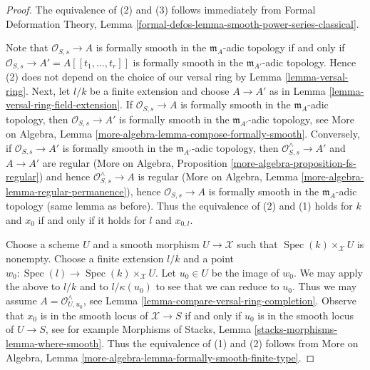 \documentclass[10pt,a4paper]{amsart}
\theoremstyle{plain}
\theoremstyle{definition}
\theoremstyle{remark}
\numberwithin{equation}{subsection}
\def\Spec{\mathop{\mathrm{Spec}}}
\begin{document}
\begin{proof}
The equivalence of (2) and (3) follows immediately from
Formal Deformation Theory, Lemma
\ref{formal-defos-lemma-smooth-power-series-classical}.

\medskip\noindent
Note that $\mathcal{O}_{S, s} \to A$ is formally smooth in the
$\mathfrak m_A$-adic topology if and only if
$\mathcal{O}_{S, s} \to A' = A[[t_1, \ldots, t_r]]$
is formally smooth in the $\mathfrak m_{A'}$-adic topology.
Hence (2) does not depend on the choice
of our versal ring by Lemma \ref{lemma-versal-ring}.
Next, let $l/k$ be a finite extension and choose
$A \to A'$ as in Lemma \ref{lemma-versal-ring-field-extension}.
If $\mathcal{O}_{S, s} \to A$ is formally smooth in the
$\mathfrak m_A$-adic topology, then $\mathcal{O}_{S, s} \to A'$
is formally smooth in the $\mathfrak m_{A'}$-adic topology, see
More on Algebra, Lemma \ref{more-algebra-lemma-compose-formally-smooth}.
Conversely, if $\mathcal{O}_{S, s} \to A'$
is formally smooth in the $\mathfrak m_{A'}$-adic topology,
then $\mathcal{O}_{S, s}^\wedge \to A'$ and $A \to A'$ are regular
(More on Algebra, Proposition \ref{more-algebra-proposition-fs-regular})
and hence $\mathcal{O}_{S, s}^\wedge \to A$ is regular
(More on Algebra, Lemma \ref{more-algebra-lemma-regular-permanence}),
hence $\mathcal{O}_{S, s} \to A$ is formally smooth in the
$\mathfrak m_A$-adic topology (same lemma as before).
Thus the equivalence of (2) and (1) holds for
$k$ and $x_0$ if and only if it holds for $l$ and $x_{0, l}$.

\medskip\noindent
Choose a scheme $U$ and a smooth morphism $U \to \mathcal{X}$ such
that $\Spec(k) \times_\mathcal{X} U$ is nonempty. Choose a finite
extension $l/k$ and a point $w_0 : \Spec(l) \to \Spec(k) \times_\mathcal{X} U$.
Let $u_0 \in U$ be the image of $w_0$.
We may apply the above to $l/k$ and to $l/\kappa(u_0)$
to see that we can reduce to $u_0$. Thus we may assume
$A = \mathcal{O}_{U, u_0}^\wedge$, see
Lemma \ref{lemma-compare-versal-ring-completion}.
Observe that $x_0$ is in the smooth locus of $\mathcal{X} \to S$
if and only if $u_0$ is in the smooth locus of $U \to S$, see for example
Morphisms of Stacks, Lemma \ref{stacks-morphisms-lemma-where-smooth}.
Thus the equivalence of (1) and (2) follows from
More on Algebra, Lemma \ref{more-algebra-lemma-formally-smooth-finite-type}.
\end{proof}
\end{document}
